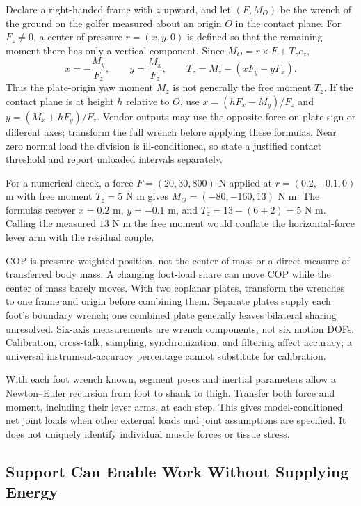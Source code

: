 Declare a right-handed frame with $z$ upward, and let $(F,M_O)$ be the wrench
of the ground on the golfer measured about an origin $O$ in the contact plane.
For $F_z\ne0$, a center of pressure $r=(x,y,0)$ is defined so that the remaining
moment there has only a vertical component. Since
$M_O=r\times F+T_z e_z$,
\begin{equation}
 x=-\frac{M_y}{F_z},\qquad y=\frac{M_x}{F_z},\qquad
 T_z=M_z-(xF_y-yF_x).
 \label{eq:cop_computation}
\end{equation}
Thus the plate-origin yaw moment $M_z$ is not generally the free moment $T_z$.
If the contact plane is at height $h$ relative to $O$, use
$x=(hF_x-M_y)/F_z$ and $y=(M_x+hF_y)/F_z$. Vendor outputs may use the opposite
force-on-plate sign or different axes; transform the full wrench before applying
these formulas. Near zero normal load the division is ill-conditioned, so state
a justified contact threshold and report unloaded intervals separately.

For a numerical check, a force $F=(20,30,800)$ N applied at
$r=(0.2,-0.1,0)$ m with free moment $T_z=5$ N m gives
$M_O=(-80,-160,13)$ N m. The formulas recover $x=0.2$ m, $y=-0.1$ m, and
$T_z=13-(6+2)=5$ N m. Calling the measured $13$ N m the free moment would
conflate the horizontal-force lever arm with the residual couple.

COP is pressure-weighted position, not the center of mass or a direct measure
of transferred body mass. A changing foot-load share can move COP while the
center of mass barely moves. With two coplanar plates, transform the wrenches
to one frame and origin before combining them. Separate plates supply each
foot's boundary wrench; one combined plate generally leaves bilateral sharing
unresolved. Six-axis measurements are wrench components, not six motion DOFs.
Calibration, cross-talk, sampling, synchronization, and filtering affect accuracy;
a universal instrument-accuracy percentage cannot substitute for calibration.

With each foot wrench known, segment poses and inertial parameters allow a
Newton--Euler recursion from foot to shank to thigh. Transfer both force and
moment, including their lever arms, at each step. This gives model-conditioned
net joint loads when other external loads and joint assumptions are specified.
It does not uniquely identify individual muscle forces or tissue stress.

\subsection{Support Can Enable Work Without Supplying Energy}

